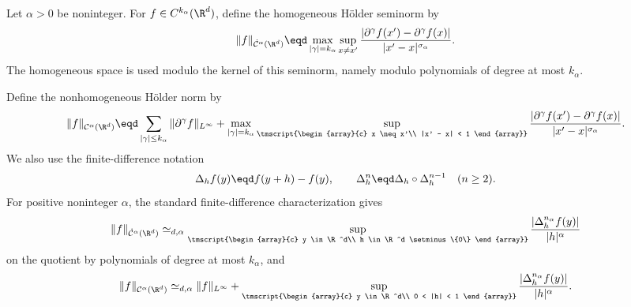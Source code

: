 \begin{definition}
  \label{def:holder-spaces}Let $\alpha > 0$ be noninteger. For $f \in
  C^{k_{\alpha}} (\R^d)$, define the homogeneous H{\"o}lder seminorm by
  \begin{equation}
    \label{eq:holder-homogeneous-seminorm} \|f\|_{\dot{\mathcal{C}}^{\alpha}
    (\R^d)} \eqd \max_{| \gamma | = k_{\alpha}} \sup_{x \neq x'}  \frac{|
    \partial^{\gamma} f (x') - \partial^{\gamma} f (x) |}{|x' -
    x|^{\sigma_{\alpha}}} .
  \end{equation}
  The homogeneous space is used modulo the kernel of this seminorm, namely
  modulo polynomials of degree at most $k_{\alpha}$.
  
  Define the nonhomogeneous H{\"o}lder norm by
  \begin{equation}
    \label{eq:holder-nonhomogeneous-norm} \|f\|_{\mathcal{C}^{\alpha} (\R^d)}
    \eqd \sum_{| \gamma | \le k_{\alpha}} \| \partial^{\gamma}
    f\|_{L^{\infty}} + \max_{| \gamma | = k_{\alpha}}
    \sup_{\tmscript{\begin{array}{c}
      x \neq x'\\
      |x' - x| < 1
    \end{array}}}  \frac{| \partial^{\gamma} f (x') - \partial^{\gamma} f (x)
    |}{|x' - x|^{\sigma_{\alpha}}} .
  \end{equation}
  We also use the finite-difference notation
  \[ \Delta_h f (y) \eqd f (y + h) - f (y), \qquad \Delta_h^n \eqd \Delta_h
     \circ \Delta_h^{n - 1}  \quad (n \ge 2) . \]
  For positive noninteger $\alpha$, the standard finite-difference
  characterization gives
  \begin{equation}
    \label{eq:holder-homogeneous-finite-difference}
    \|f\|_{\dot{\mathcal{C}}^{\alpha} (\R^d)} \simeq_{d, \alpha}
    \sup_{\tmscript{\begin{array}{c}
      y \in \R^d\\
      h \in \R^d \setminus \{0\}
    \end{array}}}  \frac{| \Delta_h^{n_{\alpha}} f (y) |}{|h|^{\alpha}}
  \end{equation}
  on the quotient by polynomials of degree at most $k_{\alpha}$, and
  \begin{equation}
    \label{eq:holder-nonhomogeneous-finite-difference}
    \|f\|_{\mathcal{C}^{\alpha} (\R^d)} \simeq_{d, \alpha} \|f\|_{L^{\infty}}
    + \sup_{\tmscript{\begin{array}{c}
      y \in \R^d\\
      0 < |h| < 1
    \end{array}}}  \frac{| \Delta_h^{n_{\alpha}} f (y) |}{|h|^{\alpha}} .
  \end{equation}
\end{definition}

